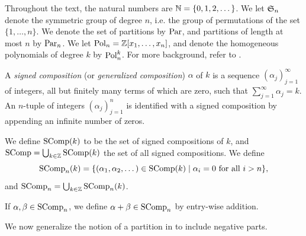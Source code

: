 \documentclass[11pt]{amsart}
\begin{document}
Throughout the text, the natural numbers are \(\mathbb{N}=\{0, 1, 2, \dots\} \). We let $\mathfrak{S}_n$ denote the symmetric group of degree $n$, i.e. the group of permutations of the set $\{1,\dots, n\}$. We denote the set of partitions by \(\mathrm{Par}\), and partitions of length at most \(n\) by \(\mathrm{Par}_n\). We let \(\mathrm{Pol}_n = \mathbb{Z} [x_1,\dots,x_n]\), and denote  the homogeneous polynomials of degree \(k\) by \(\mathrm{Pol}_n^k\). For more background, refer to \cite[Ch.~I]{Mac15}. 

\begin{defin}\label{def:scomp}
    A \emph{signed composition} (or \emph{generalized composition}) $\alpha$ of $k$ is a sequence 
    $(\alpha_{j})_{j = 1}^{\infty} $ of integers, all but finitely many terms of which are zero, such that $\sum_{ j = 1} ^{\infty} \alpha_j = k$.  An \(n\)-tuple of integers \((\alpha_j)_{j = 1}^n\) is identified with a signed composition by appending an infinite number of zeros. 
    
    We define $\mathrm{SComp}(k)$ to be the set of signed compositions of $k$, and $\mathrm{SComp} = \bigcup_{k \in \mathbb{Z}} \mathrm{SComp}(k)$ the set of all signed compositions.  We define
    \begin{equation}
        \mathrm{SComp}_n(k)=\{(\alpha_1, \alpha_2, \dots) \in \mathrm{SComp}(k) \mid \alpha_i=0 \text{ for all } i>n\},
    \end{equation}
    and $\mathrm{SComp}_n = \bigcup_{k \in \mathbb{Z}} \mathrm{SComp}_n(k)$.
\end{defin} 

If $\alpha, \beta \in \mathrm{SComp}_n$, we define $\alpha+\beta \in \mathrm{SComp}_n$ by entry-wise addition. 

We now generalize the notion of a partition in \cite[Ch.~I, \S1]{Mac15} to include negative parts. 
\end{document}
